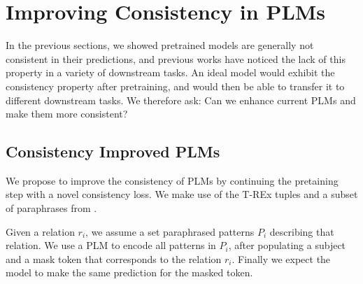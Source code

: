 \section{Improving Consistency in PLMs}
\label{sec:adding_consistency}

In the previous sections, we showed pretrained models are generally not consistent in their predictions, and previous works have noticed the lack of this property in a variety of downstream tasks.
An ideal model would exhibit the consistency property after pretraining, and would then be able to transfer it to different downstream tasks. We therefore ask:
Can we enhance current PLMs and make them more consistent?

\subsection{Consistency Improved PLMs}
We propose to improve the consistency of PLMs by continuing the pretaining step with a novel consistency loss. %
We make use of the T-REx tuples and a subset of paraphrases from \resource{}.

Given a relation $r_i$, we
assume a set paraphrased patterns $P_i$ describing that relation.
We use a PLM to encode all patterns in $P_i$, after populating a subject and a mask token that corresponds to the relation $r_i$. Finally we expect the model to make the same prediction for the masked token.


